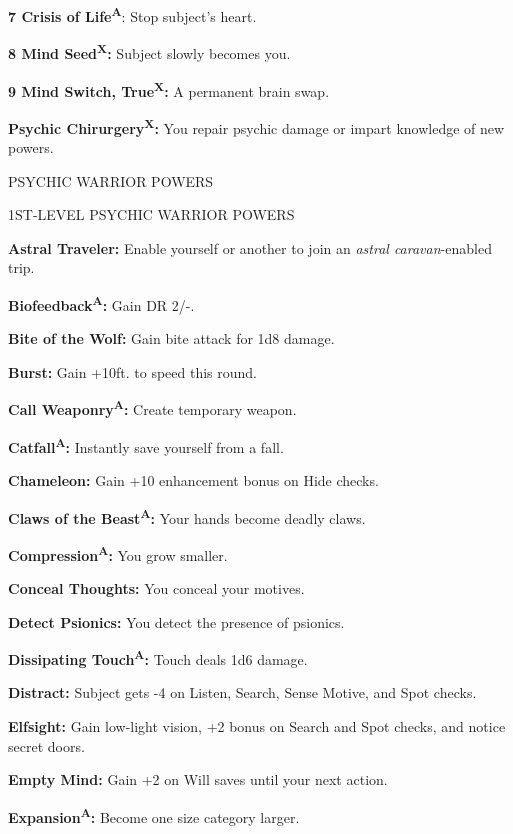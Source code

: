 \documentclass{article}
\begin{document}
\textbf{7  Crisis of Life}\textsuperscript{\textbf{A}}: Stop subject's heart.

\textbf{8  Mind Seed}\textsuperscript{\textbf{X}}\textbf{:} Subject slowly becomes 
you.

\textbf{9  Mind Switch, True}\textsuperscript{\textbf{X}}\textbf{:} A permanent 
brain swap.

\parindent=0pt
\textbf{Psychic Chirurgery}\textsuperscript{\textbf{X}}\textbf{:} You repair psychic 
damage or impart knowledge of new powers.

\vspace{12pt}
\leftskip=0pt
{\LARGE{}PSYCHIC WARRIOR POWERS}

1ST-LEVEL PSYCHIC WARRIOR POWERS 

\textbf{Astral Traveler: }Enable yourself or another to join an \textit{astral 
caravan}-enabled trip.

\textbf{Biofeedback}\textsuperscript{\textbf{A}}\textbf{: }Gain DR 2/-.

\textbf{Bite of the Wolf: }Gain bite attack for 1d8 damage.

\textbf{Burst: }Gain +10ft. to speed this round.

\textbf{Call Weaponry}\textsuperscript{\textbf{A}}\textbf{: }Create temporary weapon.

\textbf{Catfall}\textsuperscript{\textbf{A}}\textbf{: }Instantly save yourself 
from a fall. 

\textbf{Chameleon: }Gain +10 enhancement bonus on Hide checks.

\textbf{Claws of the Beast}\textsuperscript{\textbf{A}}\textbf{: }Your hands become 
deadly claws.

\textbf{Compression}\textsuperscript{\textbf{A}}\textbf{: }You grow smaller.

\textbf{Conceal Thoughts: }You conceal your motives.

\textbf{Detect Psionics: }You detect the presence of psionics.

\textbf{Dissipating Touch}\textsuperscript{\textbf{A}}\textbf{: }Touch deals 1d6 
damage.

\textbf{Distract: }Subject gets -4 on Listen, Search, Sense Motive, and Spot checks.

\textbf{Elfsight: }Gain low-light vision, +2 bonus on Search and Spot checks, and 
notice secret doors.

\textbf{Empty Mind: }Gain +2 on Will saves until your next action.

\textbf{Expansion}\textsuperscript{\textbf{A}}\textbf{: }Become one size category 
larger.
\end{document}
